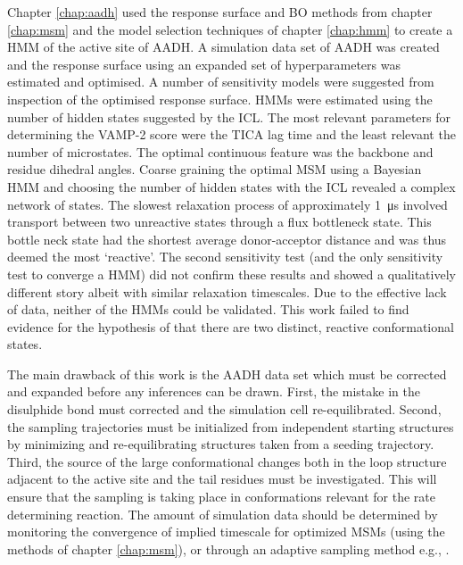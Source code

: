 Chapter \ref{chap:aadh} used the response surface and BO methods from chapter \ref{chap:msm} and the model selection techniques of chapter \ref{chap:hmm} to create a HMM of the active site of AADH. A simulation data set of AADH was created and the response surface using an expanded set of hyperparameters was estimated and optimised. A number of sensitivity models were suggested from inspection of the optimised response surface. HMMs were estimated using the number of hidden states suggested by the ICL. The most relevant parameters for determining the VAMP-2 score were the TICA lag time and the least relevant the number of microstates.  The optimal continuous feature was the backbone and residue dihedral angles. Coarse graining the optimal MSM using a Bayesian HMM and choosing the number of hidden states with the ICL revealed a complex network of states. The slowest relaxation process of approximately \SI{1}{\micro\second} involved transport between two unreactive states through a flux bottleneck state. This bottle neck state had the shortest average donor-acceptor distance and was thus deemed the most `reactive'. The second sensitivity test (and the only sensitivity test to converge a HMM) did not confirm these results and showed a qualitatively different story albeit with similar relaxation timescales. Due to the effective lack of data, neither of the HMMs could be validated. This work failed to find evidence for the hypothesis of \cite{glowackiTakingOckhamRazor2012b} that there are two distinct, reactive conformational states. 

The main drawback of this work is the AADH data set which must be corrected and expanded before any inferences can be drawn. First, the mistake in the disulphide bond must corrected and the simulation cell re-equilibrated. Second, the sampling trajectories must be initialized from independent starting structures by minimizing and re-equilibrating structures taken from a seeding trajectory. Third, the source of the large conformational changes both in the loop structure adjacent to the active site and the tail residues must be investigated. This will ensure that the sampling is taking place in  conformations relevant for the rate determining reaction. The amount of simulation data should be determined by monitoring the convergence of implied timescale  for optimized MSMs (using the methods of chapter \ref{chap:msm}), or through an adaptive sampling method e.g., \cite{doerrOntheFlyLearningSampling2014}. 

